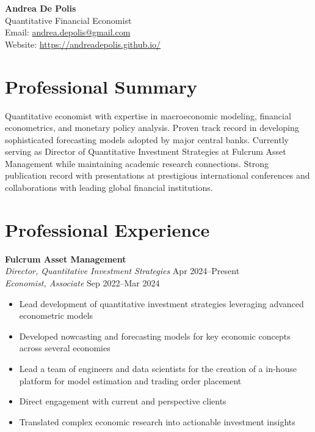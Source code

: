 \documentclass[11pt,a4paper]{article}
\begin{document}
\begin{center}
    {\LARGE \textbf{Andrea De Polis}}\\[0.2cm]
    {\large Quantitative Financial Economist}\\[0.3cm]
    Email: \href{mailto:andrea.depolis@gmail.com}{andrea.depolis@gmail.com}\\
    Website: \url{https://andreadepolis.github.io/}\\
\end{center}

\section{Professional Summary}

Quantitative economist with expertise in macroeconomic modeling, financial econometrics, and monetary policy analysis. Proven track record in developing sophisticated forecasting models adopted by major central banks. Currently serving as Director of Quantitative Investment Strategies at Fulcrum Asset Management while maintaining academic research connections. Strong publication record with presentations at prestigious international conferences and collaborations with leading global financial institutions.

\section{Professional Experience}


\noindent\textbf{Fulcrum Asset Management}\\
\textit{Director, Quantitative Investment Strategies} \hfill Apr 2024--Present\\
\textit{Economist, Associate} \hfill Sep 2022--Mar 2024
\begin{itemize}[leftmargin=0.5cm, itemsep=0pt]
    \item Lead development of quantitative investment strategies leveraging advanced econometric models
    \item Developed nowcasting and forecasting models for key economic concepts across several economies
    \item Lead a team of engineers and data scientists for the creation of a in-house platform for model estimation and trading order placement
    \item Direct engagement with current and perspective clients
    \item Translated complex economic research into actionable investment insights
\end{itemize}
\end{document}
